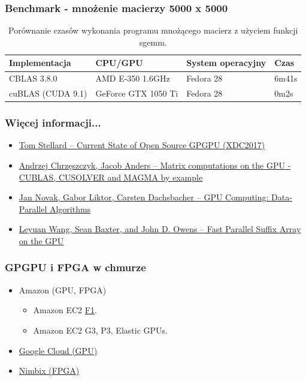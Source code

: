 \documentclass[dvipsnames,table]{beamer}
\begin{document}
\begin{frame}
\frametitle{Benchmark - mnożenie macierzy 5000 x 5000}
\begin{table}[]
\centering
\caption{Porównanie czasów wykonania programu mnożącego macierz z użyciem funkcji sgemm.}
\label{porownanie}
\scriptsize
\begin{tabular}{llll}
\hline
Implementacja & CPU/GPU   & System operacyjny & Czas  \\ \hline
CBLAS 3.8.0   & AMD E-350 1.6GHz & Fedora 28         & 6m41s \\
cuBLAS (CUDA 9.1) & GeForce GTX 1050 Ti & Fedora 28 & 0m2s  \\ \hline
\end{tabular}
\normalsize
\end{table}
\end{frame}

\begin{frame}
\frametitle{Więcej informacji...}
\begin{itemize}
	\item \href{https://www.x.org/wiki/Events/XDC2017/Stellard_GPGPU.pdf}{Tom Stellard -- Current State of Open Source GPGPU (XDC2017)}
	\item \href{https://developer.nvidia.com/sites/default/files/akamai/cuda/files/Misc/mygpu.pdf}{Andrzej Chrzęszczyk, Jacob Anders -- Matrix computations on the GPU - CUBLAS, CUSOLVER and MAGMA by example}
	\item \href{https://cg.ivd.kit.edu/downloads/GPUComputing_assignment_2.pdf}{Jan Novak, Gabor Liktor, Carsten Dachsbacher -- GPU Computing: Data-Parallel Algorithms}
	\item \href{https://pdfs.semanticscholar.org/presentation/624a/e2c934200ea7f09b9d6412685ef11f81c810.pdf}{Leyuan Wang, Sean Baxter, and John D. Owens -- Fast Parallel Suffix Array on the GPU}

\end{itemize}
\end{frame}

\begin{frame}
	\frametitle{GPGPU i FPGA w chmurze}
\begin{itemize}
	\item Amazon (GPU, FPGA)
	\begin{itemize}
		\item Amazon EC2 \href{https://aws.amazon.com/ec2/instance-types/f1/}{F1}.
		\item Amazon EC2 G3, P3, Elastic GPUs.
	\end{itemize}
	\item \href{https://cloud.google.com/gpu/}{Google Cloud (GPU)}
	\item \href{https://www.nimbix.net/xilinx/}{Nimbix (FPGA)}
\end{itemize}
\end{frame}
\end{document}
